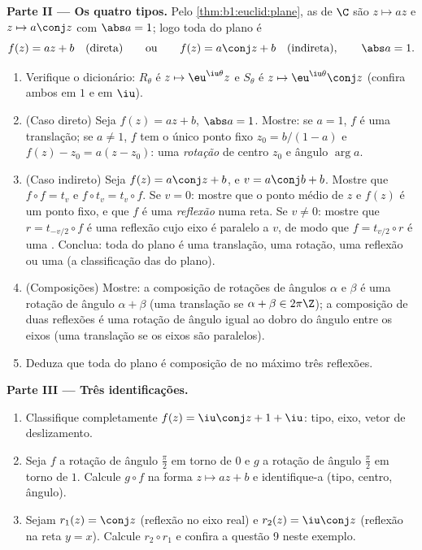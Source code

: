 \begin{problem}
\medskip
\noindent\textbf{Parte II --- Os quatro tipos.} Pelo \cref{thm:b1:euclid:plane}, as
  de $\C$ são $z
\mapsto az$ e $z \mapsto a\conj z$ com $\abs a = 1$; logo toda
 do plano é
\[
f(z) = a z + b \quad (\text{direta}) \qquad\text{ou}\qquad
f(z) = a\conj z + b \quad (\text{indireta}), \qquad \abs a = 1 .
\]
\begin{enumerate}[resume]
  \item Verifique o dicionário: $R_\theta$ é $z \mapsto
        \eu^{\iu\theta}z$ e $S_\theta$ é $z \mapsto
        \eu^{\iu\theta}\conj z$
        (confira ambos em $1$ e em $\iu$).
  \item (Caso direto) Seja $f(z) = az + b$, $\abs a = 1$. Mostre: se $a = 1$, $f$ é
        uma translação; se $a \neq 1$, $f$ tem o único ponto fixo $z_0 = b/(1 - a)$ e
        $f(z) - z_0
        = a(z - z_0)$: uma \emph{rotação} de centro $z_0$ e ângulo $\arg a$.
  \item (Caso indireto) Seja $f(z) = a\conj z + b$, e $v =
        a\conj b + b$. Mostre que $f \circ f = t_v$ e
        $f \circ t_v =
        t_v \circ f$. Se $v = 0$: mostre que o ponto médio de $z$ e $f(z)$
        é um ponto fixo, e que $f$ é uma \emph{reflexão} numa reta.
        Se $v \neq 0$: mostre que $r
        = t_{-v/2}\circ f$ é uma reflexão cujo eixo é
        paralelo a $v$, de modo que $f = t_{v/2} \circ r$ é uma \emph{}. Conclua: toda  do plano é uma
        translação, uma rotação, uma reflexão ou uma  (a classificação das  do plano).
  \item (Composições) Mostre: a composição de rotações de ângulos
        $\alpha$ e $\beta$ é uma rotação de ângulo $\alpha + \beta$ (uma
        translação se $\alpha + \beta \in
        2\pi\Z$); a composição de duas reflexões é uma
        rotação de ângulo igual ao dobro do ângulo entre os eixos
        (uma translação se os eixos são paralelos).
  \item Deduza que toda  do plano é composição de no
        máximo três reflexões.
\end{enumerate}

\medskip
\noindent\textbf{Parte III --- Três identificações.}
\begin{enumerate}[resume]
  \item Classifique completamente $f(z) = \iu\conj z + 1 + \iu$: tipo, eixo, vetor de
        deslizamento.
  \item Seja $f$ a rotação de ângulo $\frac\pi2$ em torno de $0$ e $g$ a
        rotação de ângulo $\frac\pi2$ em torno de $1$. Calcule $g \circ f$ na
        forma $z \mapsto az + b$ e identifique-a (tipo, centro, ângulo).
  \item Sejam $r_1(z) = \conj z$ (reflexão no eixo real) e $r_2(z) = \iu\conj z$ (reflexão na
        reta $y = x$). Calcule $r_2 \circ r_1$ e confira a questão 9 neste
        exemplo.
\end{enumerate}


\end{problem}
